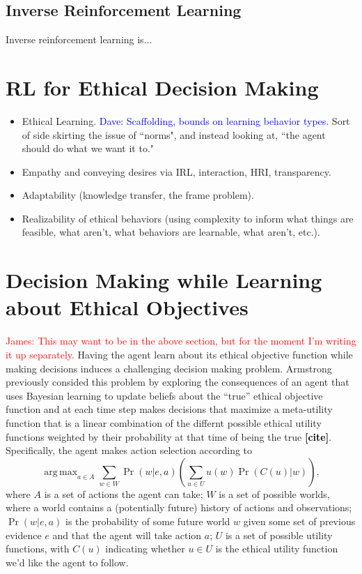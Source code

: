 \documentclass[11pt]{article}
\newcommand\davenote[1]{\textcolor{blue}{Dave: #1}}
\newcommand\jmnote[1]{\textcolor{red}{James: #1}}
\newcommand\ncite{\textcolor{black}{{\bf [cite]}}}
\DeclareMathOperator*{\argmax}{arg\,max}
\begin{document}
\subsection{Inverse Reinforcement Learning}

Inverse reinforcement learning is...


\section{RL for Ethical Decision Making}

\begin{itemize}
\item Ethical Learning. \davenote{Scaffolding, bounds on learning behavior types}. Sort of side skirting the issue of ``norms", and instead looking at, ``the agent should do what we want it to."
\item Empathy and conveying desires via IRL, interaction, HRI, transparency.
\item Adaptability (knowledge transfer, the frame problem).
\item Realizability of ethical behaviors (using complexity to inform what things are feasible, what aren't, what behaviors are learnable, what aren't, etc.).
\end{itemize}

\section{Decision Making while Learning about Ethical Objectives}
\jmnote{This may want to be in the above section, but for the moment I'm writing it up separately.}
Having the agent learn about its ethical objective function while making decisions induces a challenging decision making problem. Armstrong previously consided this problem by exploring the consequences of an agent that uses Bayesian learning to update beliefs about the ``true'' ethical objective function and at each time step makes decisions that maximize a meta-utility function that is a linear combination of the differnt possible ethical utility functions weighted by their probability at that time of being the true \ncite. Specifically, the agent makes action selection according to
\begin{equation}
\label{eq:armstrong}
\argmax_{a \in A} \sum_{w \in W} \Pr(w | e, a) \left( \sum_{u \in U} u(w) \Pr(C(u)|w) \right),
\end{equation}
where $A$ is a set of actions the agent can take; $W$ is a set of possible worlds, where a world contains a (potentially future) history of actions and observations; $\Pr(w | e, a)$ is the probability of some future world $w$ given some set of previous evidence $e$ and that the agent will take action $a$; $U$ is a set of possible utility functions, with $C(u)$ indicating whether $u \in U$ is the ethical utility function we'd like the agent to follow.
\end{document}
